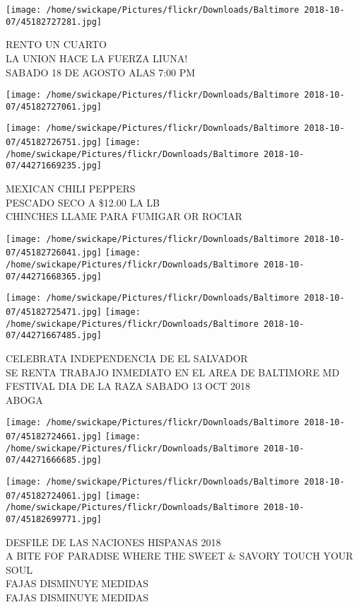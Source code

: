 \documentclass[10pt,letterpaper]{article}
\begin{document}
\texttt{[image: /home/swickape/Pictures/flickr/Downloads/Baltimore 2018-10-07/45182727281.jpg]}

RENTO UN CUARTO\\
LA UNION HACE LA FUERZA LIUNA!\\
SABADO 18 DE AGOSTO ALAS 7:00 PM
\pagebreak

\texttt{[image: /home/swickape/Pictures/flickr/Downloads/Baltimore 2018-10-07/45182727061.jpg]}

\vspace{0.25in}
\texttt{[image: /home/swickape/Pictures/flickr/Downloads/Baltimore 2018-10-07/45182726751.jpg]}
\texttt{[image: /home/swickape/Pictures/flickr/Downloads/Baltimore 2018-10-07/44271669235.jpg]}

MEXICAN CHILI PEPPERS\\
PESCADO SECO A \$12.00 LA LB\\
CHINCHES LLAME PARA FUMIGAR OR ROCIAR
\pagebreak

\texttt{[image: /home/swickape/Pictures/flickr/Downloads/Baltimore 2018-10-07/45182726041.jpg]}
\texttt{[image: /home/swickape/Pictures/flickr/Downloads/Baltimore 2018-10-07/44271668365.jpg]}

\texttt{[image: /home/swickape/Pictures/flickr/Downloads/Baltimore 2018-10-07/45182725471.jpg]}
\texttt{[image: /home/swickape/Pictures/flickr/Downloads/Baltimore 2018-10-07/44271667485.jpg]}

CELEBRATA INDEPENDENCIA DE EL SALVADOR\\
SE RENTA TRABAJO INMEDIATO EN EL AREA DE BALTIMORE MD\\
FESTIVAL DIA DE LA RAZA SABADO 13 OCT 2018\\
ABOGA
\pagebreak

\texttt{[image: /home/swickape/Pictures/flickr/Downloads/Baltimore 2018-10-07/45182724661.jpg]}
\texttt{[image: /home/swickape/Pictures/flickr/Downloads/Baltimore 2018-10-07/44271666685.jpg]}

\texttt{[image: /home/swickape/Pictures/flickr/Downloads/Baltimore 2018-10-07/45182724061.jpg]}
\texttt{[image: /home/swickape/Pictures/flickr/Downloads/Baltimore 2018-10-07/45182699771.jpg]}

DESFILE DE LAS NACIONES HISPANAS 2018\\
A BITE FOF PARADISE WHERE THE SWEET \& SAVORY TOUCH YOUR SOUL\\
FAJAS DISMINUYE MEDIDAS\\
FAJAS DISMINUYE MEDIDAS
\pagebreak
\end{document}
